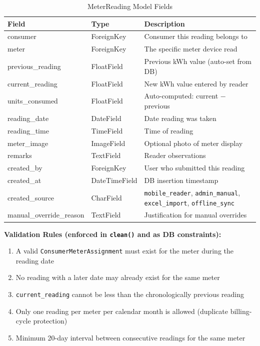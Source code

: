 \documentclass[12pt, a4paper]{report}
\begin{document}
\begin{table}[H]
\centering
\caption{MeterReading Model Fields}
\begin{tabularx}{\textwidth}{>{\ttfamily}l l X}
\toprule
\textbf{Field} & \textbf{Type} & \textbf{Description} \\
\midrule
consumer & ForeignKey & Consumer this reading belongs to \\
meter & ForeignKey & The specific meter device read \\
previous\_reading & FloatField & Previous kWh value (auto-set from DB) \\
current\_reading & FloatField & New kWh value entered by reader \\
units\_consumed & FloatField & Auto-computed: current − previous \\
reading\_date & DateField & Date reading was taken \\
reading\_time & TimeField & Time of reading \\
meter\_image & ImageField & Optional photo of meter display \\
remarks & TextField & Reader observations \\
created\_by & ForeignKey & User who submitted this reading \\
created\_at & DateTimeField & DB insertion timestamp \\
created\_source & CharField & \texttt{mobile\_reader}, \texttt{admin\_manual}, \texttt{excel\_import}, \texttt{offline\_sync} \\
manual\_override\_reason & TextField & Justification for manual overrides \\
\bottomrule
\end{tabularx}
\end{table}

\textbf{Validation Rules (enforced in \texttt{clean()} and as DB constraints):}
\begin{enumerate}[leftmargin=1.8em]
    \item A valid \texttt{ConsumerMeterAssignment} must exist for the meter during the reading date
    \item No reading with a later date may already exist for the same meter
    \item \texttt{current\_reading} cannot be less than the chronologically previous reading
    \item Only one reading per meter per calendar month is allowed (duplicate billing-cycle protection)
    \item Minimum 20-day interval between consecutive readings for the same meter
\end{enumerate}
\end{document}
